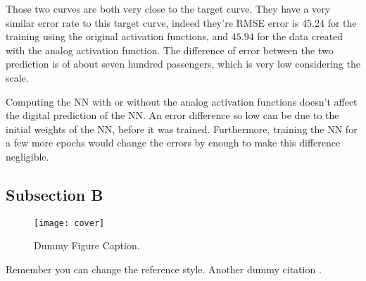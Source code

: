 Those two curves are both very close to the target curve. They have a very similar error rate to this target curve, indeed they're \ac{RMSE} error is $45.24$ for the training using the original activation functions, and $45.94$ for the data created with the analog activation function. The difference of error between the two prediction is of about seven hundred passengers, which is very low considering the scale.

Computing the \ac{NN} with or without the analog activation functions doesn't affect the digital prediction of the \ac{NN}. An error difference so low can be due to the initial weights of the \ac{NN}, before it was trained. Furthermore, training the \ac{NN} for a few more epochs would change the errors by enough to make this difference negligible.

\subsection{Subsection B}
\label{subsec:subbsectiona}

\begin{figure}[H]
  \centering
  \texttt{[image: cover]}
  \caption[Dummy Figure Caption for List of Figures.]{Dummy Figure Caption.}
  \label{fig:dummyfigure1}
\end{figure}

Remember you can change the reference style. Another dummy citation \cite{site}.
